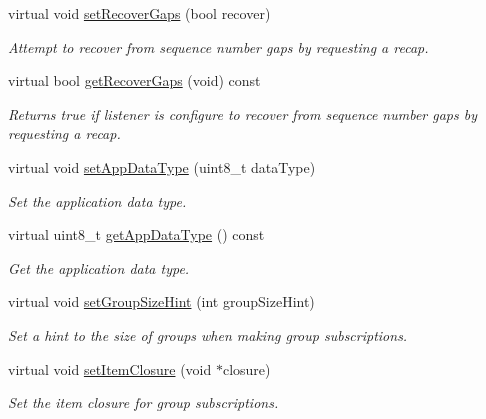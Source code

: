 \begin{DoxyCompactItemize}
virtual void \hyperlink{classWombat_1_1MamaSubscription_a4535b3a2b9db7ccdb96571b085eb7ccc}{setRecoverGaps} (bool recover)
\begin{DoxyCompactList}\small\item\em Attempt to recover from sequence number gaps by requesting a recap. \item\end{DoxyCompactList}\item 
virtual bool \hyperlink{classWombat_1_1MamaSubscription_a9db98b670db5607279d089747554413c}{getRecoverGaps} (void) const 
\begin{DoxyCompactList}\small\item\em Returns true if listener is configure to recover from sequence number gaps by requesting a recap. \item\end{DoxyCompactList}\item 
virtual void \hyperlink{classWombat_1_1MamaSubscription_a1409842bd326bae11d6b98a75f5cd911}{setAppDataType} (uint8\_\-t dataType)
\begin{DoxyCompactList}\small\item\em Set the application data type. \item\end{DoxyCompactList}\item 
virtual uint8\_\-t \hyperlink{classWombat_1_1MamaSubscription_a67bf253f898a3dd824f9020f7bc97a5a}{getAppDataType} () const 
\begin{DoxyCompactList}\small\item\em Get the application data type. \item\end{DoxyCompactList}\item 
virtual void \hyperlink{classWombat_1_1MamaSubscription_a3067981d0bddb17f0616c5afa809da21}{setGroupSizeHint} (int groupSizeHint)
\begin{DoxyCompactList}\small\item\em Set a hint to the size of groups when making group subscriptions. \item\end{DoxyCompactList}\item 
virtual void \hyperlink{classWombat_1_1MamaSubscription_a5d25d46a51905fffaba2d7b5c0fdb65c}{setItemClosure} (void $\ast$closure)
\begin{DoxyCompactList}\small\item\em Set the item closure for group subscriptions. \item\end{DoxyCompactList}\item 

\end{DoxyCompactItemize}
